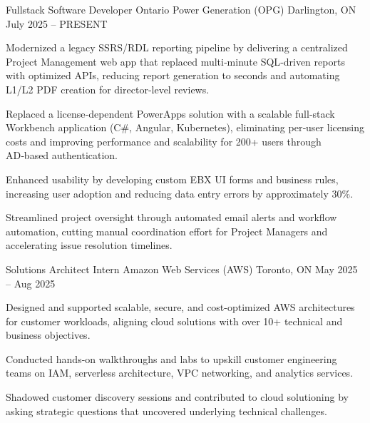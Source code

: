 
\begin{cventries}

\cventry
{Fullstack Software Developer} %
{Ontario Power Generation (OPG)} %
{Darlington, ON} %
{July 2025 – PRESENT} %
{ %
  \begin{cvitems}
    \item {Modernized a legacy SSRS/RDL reporting pipeline by delivering a centralized Project Management web app that replaced multi‑minute SQL‑driven reports with optimized APIs, reducing report generation to seconds and automating L1/L2 PDF creation for director‑level reviews.}
    \item {Replaced a license‑dependent PowerApps solution with a scalable full‑stack Workbench application (C\#, Angular, Kubernetes), eliminating per‑user licensing costs and improving performance and scalability for 200+ users through AD‑based authentication.}
    \item {Enhanced usability by developing custom EBX UI forms and business rules, increasing user adoption and reducing data entry errors by approximately 30\%.}
\item {Streamlined project oversight through automated email alerts and workflow automation, cutting manual coordination effort for Project Managers and accelerating issue resolution timelines.}
  \end{cvitems}
}
\cventry
{Solutions Architect Intern} %
{Amazon Web Services (AWS)} %
{Toronto, ON} %
{May 2025 – Aug 2025} %
{ %
  \begin{cvitems}
    \item {Designed and supported scalable, secure, and cost-optimized AWS architectures for customer workloads, aligning cloud solutions with over 10+ technical and business objectives.}
    \item {Conducted hands-on walkthroughs and labs to upskill customer engineering teams on IAM, serverless architecture, VPC networking, and analytics services.}
    \item {Shadowed customer discovery sessions and contributed to cloud solutioning by asking strategic questions that uncovered underlying technical challenges.}
  \end{cvitems}
}


\end{cventries}
